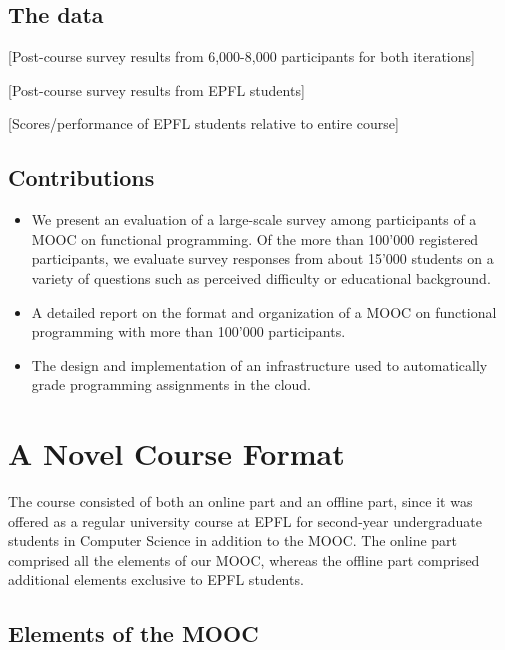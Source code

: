 \documentclass{sig-alternate}
\begin{document}
\subsection{The data}

[Post-course survey results from 6,000-8,000 participants for both iterations]

[Post-course survey results from EPFL students]

[Scores/performance of EPFL students relative to entire course]

\subsection{Contributions}

\begin{itemize}

\item We present an evaluation of a large-scale survey among participants of a
  MOOC on functional programming. Of the more than 100'000 registered
  participants, we evaluate   survey responses from about 15'000 students on a
  variety of questions such as perceived   difficulty or educational background.

\item A detailed report on the format and organization of a MOOC on functional
  programming with more than 100'000 participants.

\item The design and implementation of an infrastructure used to automatically
  grade programming assignments in the cloud.

\end{itemize}

\section{A Novel Course Format}

The course consisted of both an online part and an offline part, since it was
offered as a regular university course at EPFL for second-year undergraduate
students in Computer Science in addition to the MOOC. The online part comprised all the elements of our MOOC, whereas the offline part comprised
additional elements exclusive to EPFL students.

\subsection{Elements of the MOOC}
\end{document}
